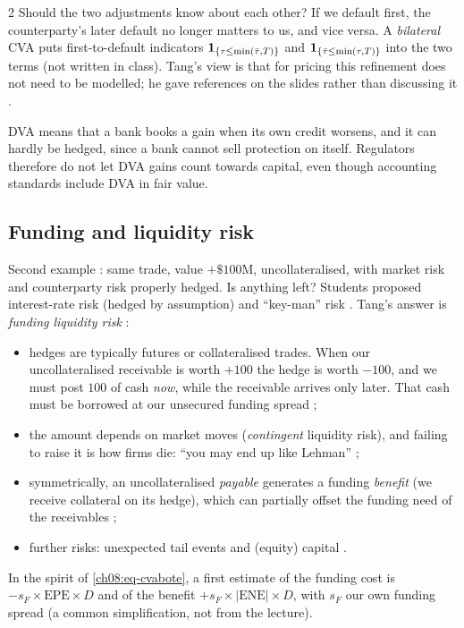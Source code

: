 \begin{paracol}{2}
Should the two adjustments know about each other? If we default first, the counterparty's later default no longer
matters to us, and vice versa. A \emph{bilateral} CVA puts first-to-default indicators $\mathbf{1}_{\{\tau\le\min(\bar\tau,T)\}}$
and $\mathbf{1}_{\{\bar\tau\le\min(\tau,T)\}}$ into the two terms (not written in class). Tang's view is that for pricing
this refinement does not need to be modelled; he gave references on the slides rather than discussing it
.

\begin{finance}
DVA means that a bank books a gain when its own credit worsens, and it can hardly be hedged, since a bank cannot
sell protection on itself. Regulators therefore do not let DVA gains count towards capital, even though
accounting standards include DVA in fair value.
\end{finance}

\subsection{Funding and liquidity risk}
Second example : same trade, value $+\$100$M, uncollateralised, with market risk and counterparty
risk properly hedged. Is anything left? Students proposed interest-rate risk (hedged by assumption) and
``key-man'' risk . Tang's answer is \emph{funding liquidity risk} :
\begin{itemize}
  \item hedges are typically futures or collateralised trades. When our uncollateralised receivable is worth
        $+100$ the hedge is worth $-100$, and we must post $100$ of cash \emph{now}, while the receivable
        arrives only later. That cash must be borrowed at our unsecured funding spread ;
  \item the amount depends on market moves (\emph{contingent} liquidity risk), and failing to raise it is how
        firms die: ``you may end up like Lehman'' ;
  \item symmetrically, an uncollateralised \emph{payable} generates a funding \emph{benefit} (we receive
        collateral on its hedge), which can partially offset the funding need of the receivables
        ;
  \item further risks: unexpected tail events and (equity) capital .
\end{itemize}
In the spirit of \eqref{ch08:eq-cvabote}, a first estimate of the funding cost is $-s_F\times\mathrm{EPE}\times D$
and of the benefit $+s_F\times|\mathrm{ENE}|\times D$, with $s_F$ our own funding spread (a common simplification,
not from the lecture).


\end{paracol}
